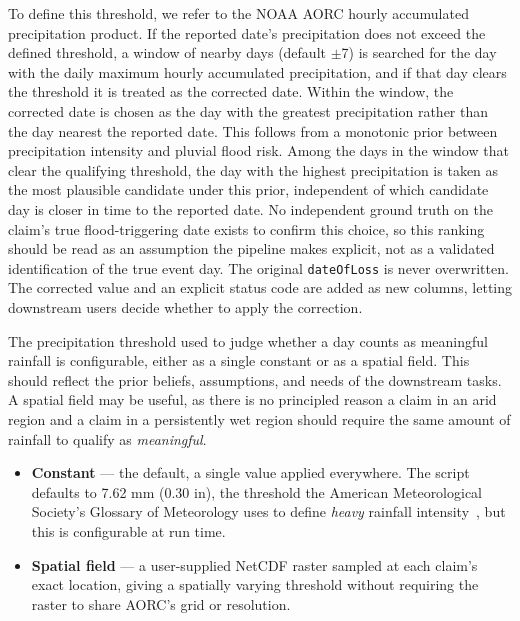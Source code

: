 To define this threshold, we refer to the NOAA AORC hourly accumulated precipitation product.
%
If the reported date's precipitation does not exceed the defined threshold, a window of nearby days (default $\pm$7) is searched for the day with the daily maximum hourly accumulated precipitation, and if that day clears the threshold it is treated as the corrected date.
%
Within the window, the corrected date is chosen as the day with the
greatest precipitation rather than the day nearest the reported date.
This follows from a monotonic prior between precipitation intensity
and pluvial flood risk. Among the days in the window that clear the qualifying
threshold, the day with the highest precipitation is taken as the most
plausible candidate under this prior, independent of which candidate
day is closer in time to the reported date. No independent ground
truth on the claim's true flood-triggering date exists to confirm this
choice, so this ranking should be read as an assumption the pipeline
makes explicit, not as a validated identification of the true event
day.
%
The original \texttt{dateOfLoss} is never overwritten. The corrected value and an explicit status code are added as new columns, letting downstream users decide whether to apply
the correction.

The precipitation threshold used to judge whether a day counts as meaningful rainfall is configurable, either as a single constant or as a spatial field.
%
This should reflect the prior beliefs, assumptions, and needs of the downstream tasks.
%
A spatial field may be useful, as there is no principled reason a claim in an arid region and a claim in a persistently wet region should require the same amount of rainfall to qualify as \emph{meaningful}.

\begin{itemize}
  \item \textbf{Constant} --- the default, a single value applied
    everywhere. The script defaults to 7.62 mm (0.30 in), the threshold
    the American Meteorological Society's Glossary of Meteorology uses
    to define \emph{heavy} rainfall intensity~\cite{ams_glossary_rain},
    but this is configurable at run time.
  \item \textbf{Spatial field} --- a user-supplied NetCDF raster
    sampled at each claim's exact location, giving a spatially varying
    threshold without requiring the raster to share AORC's grid or
    resolution.
\end{itemize}

